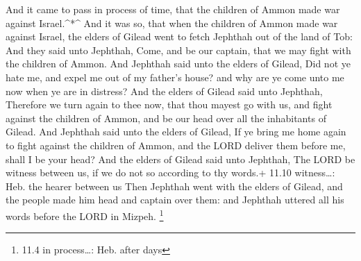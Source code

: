  And it came to pass in process of time, that the children
of Ammon made war against Israel.\^{}*\^{}  And it was so,
that when the children of Ammon made war against Israel, the elders of
Gilead went to fetch Jephthah out of the land of Tob:  And
they said unto Jephthah, Come, and be our captain, that we may fight
with the children of Ammon.  And Jephthah said unto the
elders of Gilead, Did not ye hate me, and expel me out of my father's
house? and why are ye come unto me now when ye are in distress?
 And the elders of Gilead said unto Jephthah, Therefore we
turn again to thee now, that thou mayest go with us, and fight against
the children of Ammon, and be our head over all the inhabitants of
Gilead.  And Jephthah said unto the elders of Gilead, If ye
bring me home again to fight against the children of Ammon, and the LORD
deliver them before me, shall I be your head?  And the
elders of Gilead said unto Jephthah, The LORD be witness between us, if
we do not so according to thy words.+ 11.10 witness\ldots: Heb. the
hearer between us  Then Jephthah went with the elders of
Gilead, and the people made him head and captain over them: and Jephthah
uttered all his words before the LORD in Mizpeh. \footnote{11.4 in
  process\ldots: Heb. after days}


